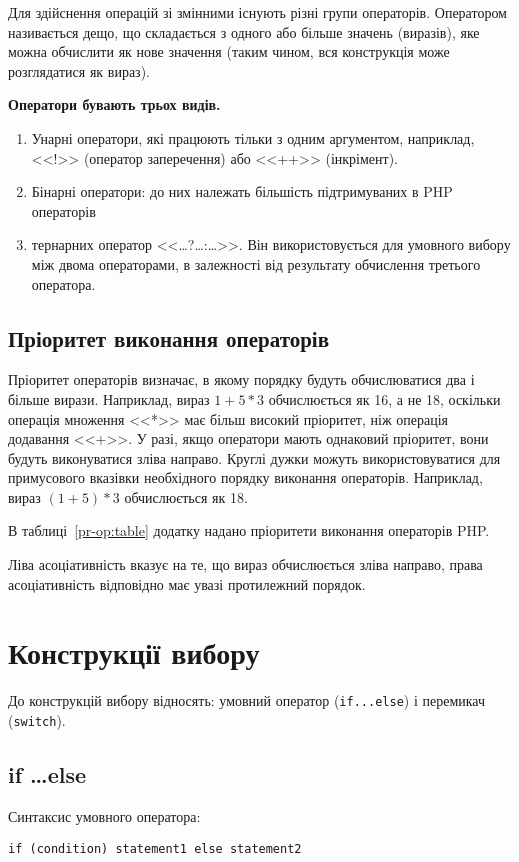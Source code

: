 Для здійснення операцій зі змінними існують різні групи операторів. Оператором називається дещо, що складається з одного або більше значень (виразів), яке можна обчислити як нове значення (таким чином, вся конструкція може розглядатися як вираз).

\textbf{Оператори бувають трьох видів.}
\begin{enumerate}
\item Унарні оператори, які працюють тільки з одним аргументом, наприклад, <<!>> (оператор заперечення) або <<++>> (інкрімент).
\item Бінарні оператори: до них належать більшість підтримуваних в PHP операторів
\item тернарних оператор <<\dots?\dots:\dots>>. Він використовується для умовного вибору між двома операторами, в залежності від результату обчислення третього оператора.
\end{enumerate}
\subsection*{Пріоритет виконання операторів}
Пріоритет операторів визначає, в якому порядку будуть обчислюватися два і більше вирази. Наприклад, вираз $1 + 5 * 3$ обчислюється як 16, а не 18, оскільки операція множення <<*>> має більш високий пріоритет, ніж операція додавання <<+>>. У разі, якщо оператори мають однаковий пріоритет, вони будуть виконуватися зліва направо. Круглі дужки можуть використовуватися для примусового вказівки необхідного порядку виконання операторів. Наприклад, вираз $(1 + 5) * 3$ обчислюється як 18.

В таблиці~\ref{pr-op:table} додатку надано пріоритети виконання операторів PHP.

Ліва асоціативність вказує на те, що вираз обчислюється зліва направо, права асоціативність відповідно має увазі протилежний порядок.
\pagebreak[3]
\section{Конструкції вибору}
\nopagebreak[4]
До конструкцій вибору відносять: умовний оператор (\verb'if...else') і перемикач (\verb'switch'). 
\subsection*{if \dots else}
Синтаксис умовного оператора:
\begin{verbatim}
if (condition) statement1 else statement2
\end{verbatim}



